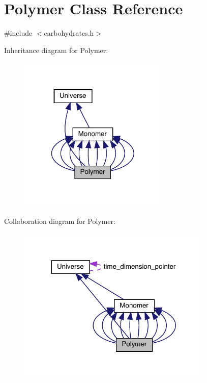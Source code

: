 \hypertarget{class_polymer}{}\section{Polymer Class Reference}
\label{class_polymer}


{\ttfamily \#include $<$carbohydrates.\+h$>$}



Inheritance diagram for Polymer\+:\nopagebreak
\begin{figure}[H]
\begin{center}
\leavevmode
\includegraphics[width=202pt]{class_polymer__inherit__graph}
\end{center}
\end{figure}


Collaboration diagram for Polymer\+:
\nopagebreak
\begin{figure}[H]
\begin{center}
\leavevmode
\includegraphics[width=263pt]{class_polymer__coll__graph}
\end{center}
\end{figure}
